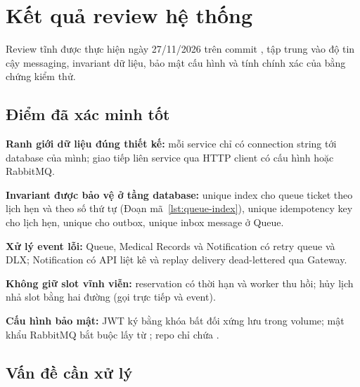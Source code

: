 \section{Kết quả review hệ thống}
\label{ch:review}

Review tĩnh được thực hiện ngày 27/11/2026 trên commit \commitmain{}, tập trung vào độ tin cậy messaging, invariant dữ liệu, bảo mật cấu hình và tính chính xác của bằng chứng kiểm thử.

\subsection{Điểm đã xác minh tốt}

\begin{codeitems}
  \item \textbf{Ranh giới dữ liệu đúng thiết kế:} mỗi service chỉ có connection string tới database của mình; giao tiếp liên service qua HTTP client có cấu hình hoặc RabbitMQ.
  \item \textbf{Invariant được bảo vệ ở tầng database:} unique index cho queue ticket theo lịch hẹn và theo số thứ tự (Đoạn mã~\ref{lst:queue-index}), unique idempotency key cho lịch hẹn, unique  cho outbox, unique inbox message ở Queue.
  \item \textbf{Xử lý event lỗi:} Queue, Medical Records và Notification có retry queue và DLX; Notification có API liệt kê và replay delivery dead-lettered qua Gateway.
  \item \textbf{Không giữ slot vĩnh viễn:} reservation có thời hạn và worker thu hồi; hủy lịch nhả slot bằng hai đường (gọi trực tiếp và event).
  \item \textbf{Cấu hình bảo mật:} JWT ký bằng khóa bất đối xứng lưu trong volume; mật khẩu RabbitMQ bắt buộc lấy từ ; repo chỉ chứa .
\end{codeitems}

\subsection{Vấn đề cần xử lý}

